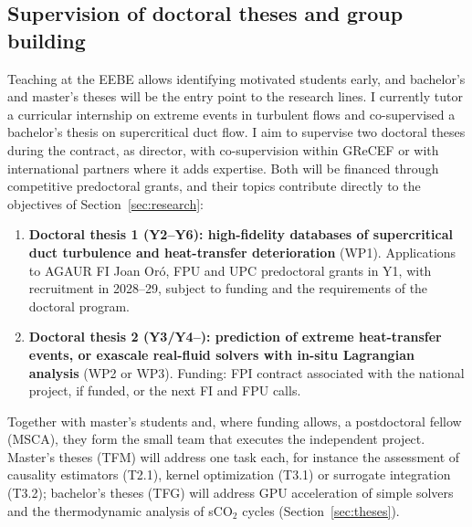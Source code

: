 \documentclass[11pt]{article}
\begin{document}
\subsection{Supervision of doctoral theses and group building}
Teaching at the EEBE allows identifying motivated students early, and bachelor's and
master's theses will be the entry point to the research lines. I currently tutor a
curricular internship on extreme events in turbulent flows and co-supervised a bachelor's
thesis on supercritical duct flow. I aim to supervise two doctoral theses during the
contract, as director, with co-supervision within GReCEF or with international partners where
it adds expertise. Both will be financed through competitive predoctoral grants, and their
topics contribute directly to the objectives of Section~\ref{sec:research}:
\begin{enumerate}
  \item \textbf{Doctoral thesis 1 (Y2--Y6): high-fidelity databases of supercritical duct
  turbulence and heat-transfer deterioration} (WP1). Applications to AGAUR FI Joan Or\'o, FPU
  and UPC predoctoral grants in Y1, with recruitment in 2028--29, subject to funding and the
  requirements of the doctoral program.
  \item \textbf{Doctoral thesis 2 (Y3/Y4--): prediction of extreme heat-transfer events, or
  exascale real-fluid solvers with in-situ Lagrangian analysis} (WP2 or WP3). Funding: FPI
  contract associated with the national project, if funded, or the next FI and FPU calls.
\end{enumerate}
Together with master's students and, where funding allows, a postdoctoral fellow (MSCA), they
form the small team that executes the independent project.
Master's theses (TFM) will address one task each, for instance the assessment of causality
estimators (T2.1), kernel optimization (T3.1) or surrogate integration (T3.2); bachelor's
theses (TFG) will address GPU acceleration of simple solvers and the thermodynamic analysis of
sCO$_2$ cycles (Section~\ref{sec:theses}).
\end{document}
